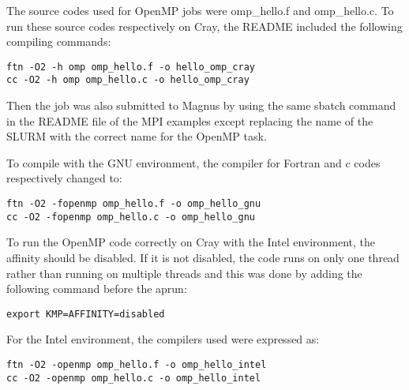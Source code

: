 The source codes used for OpenMP jobs were omp\_hello.f and omp\_hello.c. To run these source codes respectively on Cray, the README included the 
following compiling commands:

\begin{tcolorbox}
\begin{Verbatim}[fontsize=\scriptsize]
ftn -O2 -h omp omp_hello.f -o hello_omp_cray
cc -O2 -h omp omp_hello.c -o hello_omp_cray
\end{Verbatim}
\end{tcolorbox}

Then the job was also submitted to Magnus by using the same sbatch command in the README file of the MPI examples except replacing the name of the SLURM
with the correct name for the OpenMP task.

To compile with the GNU environment, the compiler for Fortran and c codes respectively changed to: 

\begin{tcolorbox}
\begin{Verbatim}[fontsize=\scriptsize]
ftn -O2 -fopenmp omp_hello.f -o omp_hello_gnu
cc -O2 -fopenmp omp_hello.c -o omp_hello_gnu
\end{Verbatim}
\end{tcolorbox}

To run the OpenMP code correctly on Cray with the Intel environment, the affinity should be disabled. If it is not disabled, the code runs on only one
thread rather than running on multiple threads and this was done by adding the following command before the aprun:

\begin{tcolorbox}
\begin{Verbatim}[fontsize=\scriptsize]
export KMP=AFFINITY=disabled
\end{Verbatim}
\end{tcolorbox}

For the Intel environment, the compilers used were expressed as:

\begin{tcolorbox}
\begin{Verbatim}[fontsize=\scriptsize]
ftn -O2 -openmp omp_hello.f -o omp_hello_intel
cc -O2 -openmp omp_hello.c -o omp_hello_intel
\end{Verbatim}
\end{tcolorbox}
